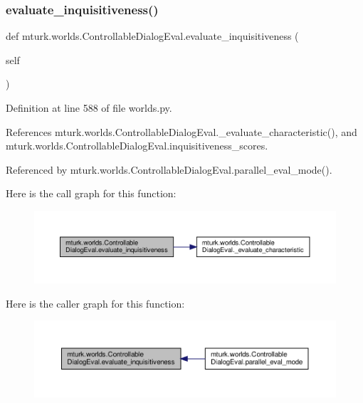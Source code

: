 \subsubsection{\texorpdfstring{evaluate\+\_\+inquisitiveness()}{evaluate\_inquisitiveness()}}
{\footnotesize\ttfamily def mturk.\+worlds.\+Controllable\+Dialog\+Eval.\+evaluate\+\_\+inquisitiveness (\begin{DoxyParamCaption}\item[{}]{self }\end{DoxyParamCaption})}



Definition at line 588 of file worlds.\+py.



References mturk.\+worlds.\+Controllable\+Dialog\+Eval.\+\_\+evaluate\+\_\+characteristic(), and mturk.\+worlds.\+Controllable\+Dialog\+Eval.\+inquisitiveness\+\_\+scores.



Referenced by mturk.\+worlds.\+Controllable\+Dialog\+Eval.\+parallel\+\_\+eval\+\_\+mode().

Here is the call graph for this function\+:
\nopagebreak
\begin{figure}[H]
\begin{center}
\leavevmode
\includegraphics[width=350pt]{classmturk_1_1worlds_1_1ControllableDialogEval_ae97a45f37f7e71c42ddbf152b4af0861_cgraph}
\end{center}
\end{figure}
Here is the caller graph for this function\+:
\nopagebreak
\begin{figure}[H]
\begin{center}
\leavevmode
\includegraphics[width=350pt]{classmturk_1_1worlds_1_1ControllableDialogEval_ae97a45f37f7e71c42ddbf152b4af0861_icgraph}
\end{center}
\end{figure}
\mbox{\label{classmturk_1_1worlds_1_1ControllableDialogEval_ab625c0747ada739776242995de66f5e9}} 
